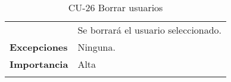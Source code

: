\begin{longtable}[t]{@{}ll@{}}
\begin{minipage}[t]{0.23\columnwidth}
\end{minipage} & \begin{minipage}[t]{0.71\columnwidth}\raggedright\strut
Se borrará el usuario seleccionado.\strut
\end{minipage}\tabularnewline
\begin{minipage}[t]{0.23\columnwidth}\raggedright\strut
\textbf{Excepciones}\strut
\end{minipage} & \begin{minipage}[t]{0.71\columnwidth}\raggedright\strut
Ninguna. \strut
\end{minipage}\tabularnewline
\begin{minipage}[t]{0.23\columnwidth}\raggedright\strut
\textbf{Importancia}\strut
\end{minipage} & \begin{minipage}[t]{0.71\columnwidth}\raggedright\strut
Alta\strut
\end{minipage}\tabularnewline
\bottomrule
\caption{CU-26 Borrar usuarios}
\end{longtable}

